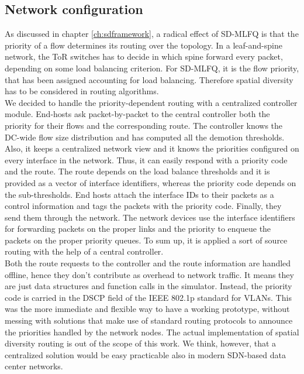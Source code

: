 \subsection{Network configuration}
As discussed in chapter \ref{ch:sdframework}, a radical effect of SD-MLFQ is that the priority of a flow determines its routing over the topology. In a leaf-and-spine network, the ToR switches has to decide in which spine forward every packet, depending on some load balancing criterion. For SD-MLFQ, it is the flow priority, that has been assigned accounting for load balancing. Therefore spatial diversity has to be considered in routing algorithms. \\
We decided to handle the priority-dependent routing with a centralized controller module. End-hosts ask packet-by-packet to the central controller both the priority for their flows and the corresponding route. The controller knows the DC-wide flow size distribution and has computed all the demotion thresholds. Also, it keeps a centralized network view and it knows the priorities configured on every interface in the network. Thus, it can easily respond with a priority code and the route. The route depends on the load balance thresholds and it is provided as a vector of interface identifiers, whereas the priority code depends on the sub-thresholds. End hosts attach the interface IDs to their packets as a control information and tags the packets with the priority code. Finally, they send them through the network. The network devices use the interface identifiers for forwarding packets on the proper links and the priority to enqueue the packets on the proper priority queues. To sum up, it is applied a sort of source routing with the help of a central controller. \\
Both the route requests to the controller and the route information are handled offline, hence they don't contribute as overhead to network traffic. It means they are just data structures and function calls in the simulator. Instead, the priority code is carried in the DSCP field of the IEEE 802.1p \cite{ek1999ieee} standard for VLANs. This was the more immediate and flexible way to have a working prototype, without messing with solutions that make use of standard routing protocols to announce the priorities handled by the network nodes. The actual implementation of spatial diversity routing is out of the scope of this work. We think, however, that a centralized solution would be easy practicable also in modern SDN-based data center networks. \\
